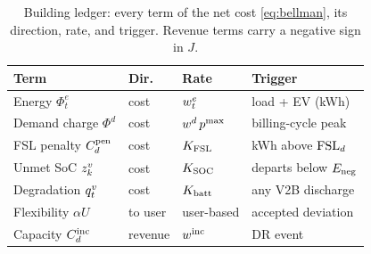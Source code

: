 \begin{table}[t]
\centering\tablesize
\caption{Building ledger: every term of the net cost \eqref{eq:bellman}, its
direction, rate, and trigger. Revenue terms carry a negative sign in $J$.}
\label{tab:bldgcost}
\begin{tabular}{@{}llll@{}}
\toprule
Term & Dir. & Rate & Trigger \\
\midrule
Energy $\Phi^e_t$ & cost & $w_{t}^{e}$ & load + EV (kWh)\\
Demand charge $\Phi^d$ & cost & $w^{d}{}\,p^{\max}$ & billing-cycle peak \\
FSL penalty $C_{d}^{\mathrm{pen}}$ & cost & $K_{\mathrm{FSL}}$ & kWh above $\mathrm{FSL}_d$ \\
Unmet SoC $z_{k}^{v}$ & cost & $K_{\mathrm{SOC}}$ & departs below $E_{\mathrm{neg}}$ \\
Degradation $q_{t}^{v}$ & cost & $K_{\mathrm{batt}}$ & any V2B discharge \\
Flexibility $\alpha U$ & to user & user-based & accepted deviation \\
Capacity $C_{d}^{\mathrm{inc}}$ & revenue & $w^{\mathrm{inc}}$ & DR event \\
\bottomrule
\end{tabular}
\end{table}
